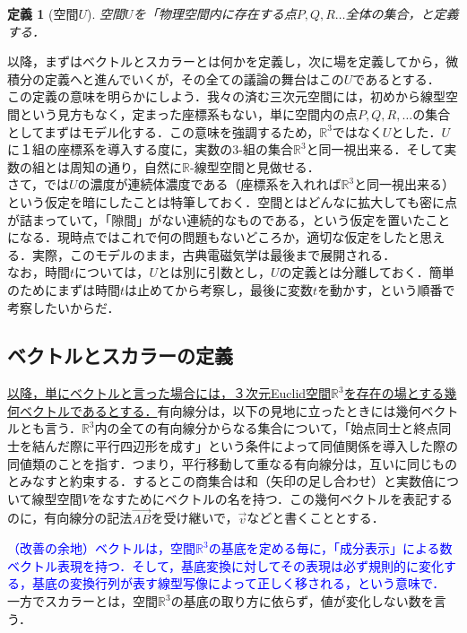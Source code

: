 \documentclass[uplatex, 12pt, a4paper]{jsarticle}
\newtheorem{definition}{定義}
\begin{document}
\begin{shadebox}\begin{definition}[空間$U$]
空間$U$を「物理空間内に存在する点$P,Q,R\dots$全体の集合，と定義する．
\end{definition}\end{shadebox}
以降，まずはベクトルとスカラーとは何かを定義し，次に場を定義してから，微積分の定義へと進んでいくが，その全ての議論の舞台はこの$U$であるとする．\\
この定義の意味を明らかにしよう．我々の済む三次元空間には，初めから線型空間という見方もなく，定まった座標系もない，単に空間内の点$P,Q,R,\ldots$の集合としてまずはモデル化する．この意味を強調するため，$\mathbb{R}^3$ではなく$U$とした．$U$に１組の座標系を導入する度に，実数の3-組の集合$\mathbb{R}^3$と同一視出来る．そして実数の組とは周知の通り，自然に$\mathbb{R}$-線型空間と見做せる．\\
さて，では$U$の濃度が連続体濃度である（座標系を入れれば$\mathbb{R}^3$と同一視出来る）という仮定を暗にしたことは特筆しておく．空間とはどんなに拡大しても密に点が詰まっていて，「隙間」がない連続的なものである，という仮定を置いたことになる．現時点ではこれで何の問題もないどころか，適切な仮定をしたと思える．実際，このモデルのまま，古典電磁気学は最後まで展開される．\\
なお，時間$t$については，$U$とは別に引数とし，$U$の定義とは分離しておく．簡単のためにまずは時間$t$は止めてから考察し，最後に変数$t$を動かす，という順番で考察したいからだ．

\subsection{ベクトルとスカラーの定義}

\underline{以降，単にベクトルと言った場合には，３次元Euclid空間$\mathbb{R}^3$を存在の場とする幾何ベクトルであるとする．}有向線分は，以下の見地に立ったときには幾何ベクトルとも言う．$\mathbb{R}^3$内の全ての有向線分からなる集合について，「始点同士と終点同士を結んだ際に平行四辺形を成す」という条件によって同値関係を導入した際の同値類のことを指す．つまり，平行移動して重なる有向線分は，互いに同じものとみなすと約束する．するとこの商集合は和（矢印の足し合わせ）と実数倍について線型空間$V$をなすためにベクトルの名を持つ．この幾何ベクトルを表記するのに，有向線分の記法$\overrightarrow{AB}$を受け継いで，$\vec{v}$などと書くこととする．

\textcolor{blue}{（改善の余地）ベクトルは，空間$\mathbb{R}^3$の基底を定める毎に，「成分表示」による数ベクトル表現を持つ．そして，基底変換に対してその表現は必ず規則的に変化する，基底の変換行列が表す線型写像によって正しく移される，という意味で．}\\
一方でスカラーとは，空間$\mathbb{R}^3$の基底の取り方に依らず，値が変化しない数を言う．
\end{document}
